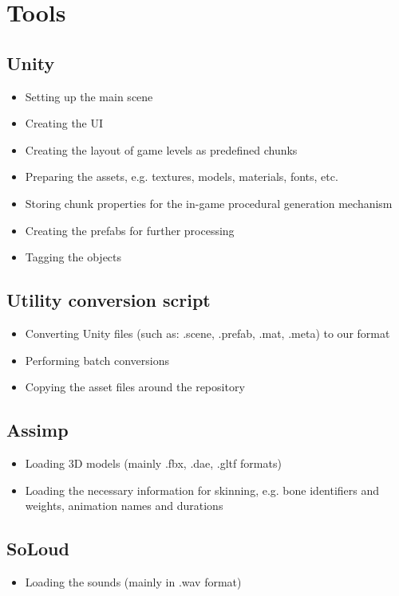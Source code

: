 \documentclass[12pt, english]{article}
\begin{document}
\section{Tools}

\subsection{Unity}
\begin{itemize}
	\item Setting up the main scene
	\item Creating the UI
	\item Creating the layout of game levels as predefined chunks
	\item Preparing the assets, e.g. textures, models, materials, fonts, etc.
	\item Storing chunk properties for the in-game procedural generation
	      mechanism
	\item Creating the prefabs for further processing
	\item Tagging the objects
\end{itemize}

\subsection{Utility conversion script}
\begin{itemize}
	\item Converting Unity files (such as: .scene, .prefab, .mat, .meta) to our format
	\item Performing batch conversions
	\item Copying the asset files around the repository
\end{itemize}

\subsection{Assimp}
\begin{itemize}
	\item Loading 3D models (mainly .fbx, .dae, .gltf formats)
	\item Loading the necessary information for skinning, e.g. bone identifiers and
	      weights, animation names and durations
\end{itemize}

\subsection{SoLoud}
\begin{itemize}
	\item Loading the sounds (mainly in .wav format)
\end{itemize}
\end{document}
